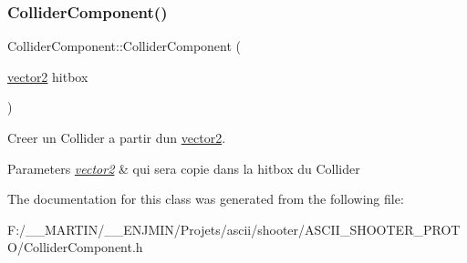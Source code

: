 \subsubsection{\texorpdfstring{Collider\+Component()}{ColliderComponent()}\hspace{0.1cm}{\footnotesize\ttfamily [2/2]}}
{\footnotesize\ttfamily Collider\+Component\+::\+Collider\+Component (\begin{DoxyParamCaption}\item[{\hyperlink{structvector2}{vector2}}]{hitbox }\end{DoxyParamCaption})\hspace{0.3cm}{\ttfamily [inline]}}



Creer un Collider a partir d\textquotesingle{}un \hyperlink{structvector2}{vector2}. 


\begin{DoxyParams}{Parameters}
{\em \hyperlink{structvector2}{vector2}} & qui sera copie dans la hitbox du Collider \\
\hline
\end{DoxyParams}


The documentation for this class was generated from the following file\+:\begin{DoxyCompactItemize}
\item 
F\+:/\+\_\+\+\_\+\+M\+A\+R\+T\+I\+N/\+\_\+\+\_\+\+E\+N\+J\+M\+I\+N/\+Projets/ascii/shooter/\+A\+S\+C\+I\+I\+\_\+\+S\+H\+O\+O\+T\+E\+R\+\_\+\+P\+R\+O\+T\+O/Collider\+Component.\+h\end{DoxyCompactItemize}
